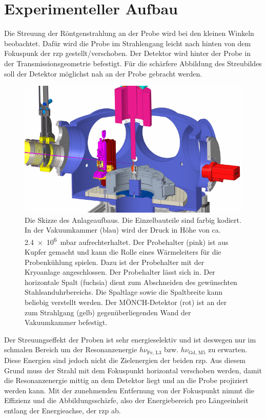 \chapter{Experimenteller Aufbau}
Die Streuung der Röntgenstrahlung an der Probe wird bei den kleinen Winkeln beobachtet. Dafür wird die Probe im Strahlengang leicht nach hinten von dem Fokuspunk der \gls{rzp} gestellt/verschoben. Der Detektor wird hinter der Probe in der Transmissionsgeometrie befestigt. Für die schärfere Abbildung des Streubildes soll der Detektor möglichst nah an der Probe gebracht werden. 
\begin{figure}[H]
    \centering
    \includegraphics{images/aufbau/aufbau_empty.pdf}
    \caption{Die Skizze des Anlageaufbaus. Die Einzelbauteile sind farbig kodiert. In der Vakuumkammer (blau) wird der Druck in Höhe von ca. \SI{2.4e6}{\milli\bar} aufrechterhaltet. Der Probehalter (pink) ist aus Kupfer gemacht und kann die Rolle eines Wärmeleiters für die Probenkühlung spielen. Dazu ist der Probehalter mit der Kryoanlage angeschlossen. Der Probehalter lässt sich in. Der horizontale Spalt (fuchsia) dient zum Abschneiden des gewünschten Stahlsanduhrbereichs. Die Spaltlage sowie die Spaltbreite kann beliebig verstellt werden. Der MÖNCH-Detektor (rot) ist an der zum Strahlgang (gelb) gegenüberliegenden Wand der Vakuumkammer befestigt.}
    \label{fig:anlage}
\end{figure}

Der Streuungseffekt der Proben ist sehr energieselektiv und ist deswegen nur im schmalen Bereich um der Resonanzenergie $h\nu_{\text{Fe, L3}}$ bzw. $h\nu_{\text{Gd, M5}}$ zu erwarten. Diese Energien sind jedoch nicht die Zielenergien der beiden \gls{rzp}. Aus diesem Grund muss der Strahl mit dem Fokuspunkt horizontal verschoben werden, damit die Resonanzenergie mittig an dem Detektor liegt und an die Probe projiziert werden kann. Mit der zunehmenden Entfernung von der Fokuspunkt nimmt die Effizienz und die Abbildungsschärfe, also der Energiebereich pro Längeeinheit entlang der Energieachse, der \gls{rzp} ab.

